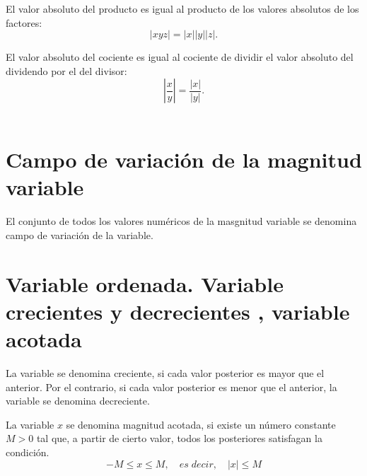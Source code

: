     \begin{tcolorbox}[colframe=white]
	\begin{prop}	
	    El valor absoluto del producto es igual al producto de los valores absolutos de los factores: $$|xyz| = |x||y||z|.$$
	\end{prop}
    \end{tcolorbox}

    \begin{tcolorbox}[colframe=white]
	\begin{prop}
	    El valor absoluto del cociente es igual al cociente de dividir el valor absoluto del dividendo por el del divisor:
	    $$\left| \dfrac{x}{y} \right| = \dfrac{|x|}{|y|}.$$\\
	\end{prop}
    \end{tcolorbox}

\setcounter{section}{3}
\section{Campo de variación de la magnitud variable}

    \begin{tcolorbox}[colframe=white]
	\begin{def.}
	    El conjunto de todos los valores numéricos de la masgnitud variable se denomina campo de variación de la variable.\\
	\end{def.}
    \end{tcolorbox}

\section{Variable ordenada. Variable crecientes y decrecientes , variable acotada}

    \begin{tcolorbox}[colframe=white]
	\begin{def.}
	    La variable se denomina creciente, si cada valor posterior es mayor que el anterior. Por el contrario, si cada valor posterior es menor que el anterior, la variable se denomina decreciente.\\
	\end{def.}
    \end{tcolorbox}

    \begin{tcolorbox}[colframe=white]
	\begin{def.}
	    La variable $x$ se denomina magnitud acotada, si existe un número constante $M>0$ tal que, a partir de cierto valor, todos los posteriores satisfagan la condición. $$-M\leq x \leq M, \quad es \; decir, \quad |x|\leq M$$\\
	\end{def.}
    \end{tcolorbox}

